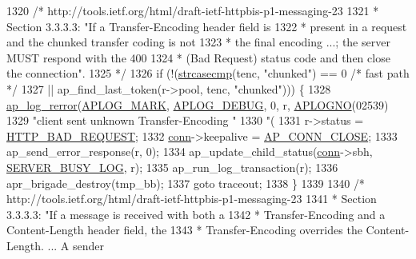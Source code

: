 \begin{DoxyCode}
{1320             \textcolor{comment}{/* http://tools.ietf.org/html/draft-ietf-httpbis-p1-messaging-23}
1321 \textcolor{comment}{             * Section 3.3.3.3: "If a Transfer-Encoding header field is}
1322 \textcolor{comment}{             * present in a request and the chunked transfer coding is not}
1323 \textcolor{comment}{             * the final encoding ...; the server MUST respond with the 400}
1324 \textcolor{comment}{             * (Bad Request) status code and then close the connection".}
1325 \textcolor{comment}{             */}
1326             \textcolor{keywordflow}{if} (!(\hyperlink{apr__cpystrn_8c_a4a00fc29b96a953fed9e0107a9c4548a}{strcasecmp}(tenc, \textcolor{stringliteral}{"chunked"}) == 0 \textcolor{comment}{/* fast path */}
1327                     || ap\_find\_last\_token(r->pool, tenc, \textcolor{stringliteral}{"chunked"}))) \{
1328                 \hyperlink{group__APACHE__CORE__LOG_ga4c112558ccffd6b363da102b2052d2a6}{ap\_log\_rerror}(\hyperlink{group__APACHE__CORE__LOG_ga655e126996849bcb82e4e5a14c616f4a}{APLOG\_MARK}, \hyperlink{group__APACHE__CORE__LOG_gadfcef90537539cf2b7d35cfbbbafeb93}{APLOG\_DEBUG}, 0, r, 
      \hyperlink{group__APACHE__CORE__LOG_ga1dee8a07e06bc5b3de8b89662c2cd666}{APLOGNO}(02539)
1329                               \textcolor{stringliteral}{"client sent unknown Transfer-Encoding "}
1330                               \textcolor{stringliteral}{"(%
1331                 r->status = \hyperlink{group__HTTP__Status_ga0c1fdbbb10800664989907cbd3a5a023}{HTTP\_BAD\_REQUEST};
1332                 \hyperlink{group__MOD__PROXY_gaaf2a99e7e3709d3e41bf0a33f1004b4e}{conn}->keepalive = \hyperlink{group__APACHE__CORE__DAEMON_gga0fc39bb8f47f9c1f418f28354416db79ac991e8ec951fe03c8c2f36495859034d}{AP\_CONN\_CLOSE};
1333                 ap\_send\_error\_response(r, 0);
1334                 ap\_update\_child\_status(\hyperlink{group__MOD__PROXY_gaaf2a99e7e3709d3e41bf0a33f1004b4e}{conn}->sbh, \hyperlink{scoreboard_8h_a27a5c403b65794dc90e380a76a500924}{SERVER\_BUSY\_LOG}, r);
1335                 ap\_run\_log\_transaction(r);
1336                 apr\_brigade\_destroy(tmp\_bb);
1337                 \textcolor{keywordflow}{goto} traceout;
1338             \}
1339 
1340             \textcolor{comment}{/* http://tools.ietf.org/html/draft-ietf-httpbis-p1-messaging-23}
1341 \textcolor{comment}{             * Section 3.3.3.3: "If a message is received with both a}
1342 \textcolor{comment}{             * Transfer-Encoding and a Content-Length header field, the}
1343 \textcolor{comment}{             * Transfer-Encoding overrides the Content-Length. ... A sender}
}}
\end{DoxyCode}
